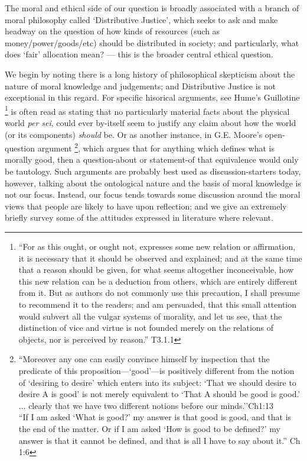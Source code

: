 
The moral and ethical side of our question is broadly associated with a branch of moral philosophy called `Distributive Justice', which seeks to ask and make headway on the question of how kinds of resources (such as money/power/goods/etc) should be distributed in society; and particularly, what does `fair' allocation mean? --- this is the broader central ethical question.

We begin by noting there is a long history of philosophical skepticism about the nature of moral knowledge and judgements; and Distributive Justice is not exceptional in this regard.
For specific hisorical arguments, see Hume's Guillotine \cite{HumeGutenberg}\footnote{``For as this ought, or ought not, expresses some new relation or affirmation, it is necessary that it should be observed and explained; and at the same time that a reason should be given, for what seems altogether inconceivable, how this new relation can be a deduction from others, which are entirely different from it. But as authors do not commonly use this precaution, I shall presume to recommend it to the readers; and am persuaded, that this small attention would subvert all the vulgar systems of morality, and let us see, that the distinction of vice and virtue is not founded merely on the relations of objects, nor is perceived by reason.'' T3.1.1} is often read as stating that no particularly material facts about the physical world \textit{per sei}, could ever by-itself seem to justify any claim about how the world (or its components) \textit{should} be.
Or as another instance, in G.E. Moore's open-question argument \cite{MooreGutenberg}\footnote{
``Moreover any one can easily convince himself by inspection that the predicate of this proposition—`good'—is positively different from the notion of ‘desiring to desire' which enters into its subject: `That we should desire to desire A is good’ is not merely equivalent to `That A should be good is good.' ... clearly that we have two different notions before our minds.''Ch1:13\\
``If I am asked ‘What is good?’ my answer is that good is good, and that is the end of the matter. Or if I am asked ‘How is good to be defined?’ my answer is that it cannot be defined, and that is all I have to say about it.'' Ch 1:6}, which argues that for anything which defines what is morally good, then a question-about or statement-of that equivalence would only be tautology.
Such arguments are probably best used as discussion-starters today, however, talking about the ontological nature and the basis of moral knowledge is not our focus.
Instead, our focus tends towards some discussion around the moral views that people are likely to have upon reflection; and we give an extremely briefly survey some of the attitudes expressed in literature where relevant.

